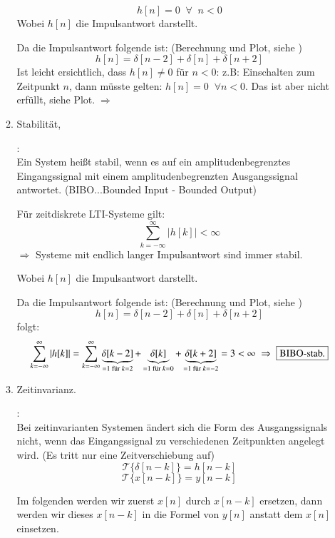 \begin{uebsp}
\begin{Answer}
\begin{enumerate}[a)]
\begin{enumerate}[1)]
\begin{definition}[Kausalität]
                        \[h[n]=0\;\;\forall\;\;n<0\]
                        Wobei $h[n]$ die Impulsantwort darstellt.
                    \end{definition}
                    Da die Impulsantwort folgende ist: (Berechnung und Plot, siehe )
                    \[h[n]=\delta[n-2]+\delta[n]+\delta[n+2]\]
                    Ist leicht ersichtlich, dass $h[n]\neq0$ für $n<0$:
                    z.B: Einschalten zum Zeitpunkt $n$, dann müsste gelten: $h[n]=0\;\;\forall n<0$.
                    Das ist aber nicht erfüllt, siehe Plot.$\;\Rightarrow\;$
                \item Stabilität,
                    \begin{definition}[Stabilität]:\\
                        Ein System heißt stabil, wenn es auf ein
                        amplitudenbegrenztes Eingangssignal mit einem
                        amplitudenbegrenzten Ausgangssignal antwortet.
                        (BIBO...Bounded Input - Bounded Output)

                        Für zeitdiskrete LTI-Systeme gilt:
                        \[\sum_{k=-\infty}^\infty\left|h[k]\right|<\infty\]
                        $\Rightarrow$ Systeme mit endlich langer Impulsantwort sind immer stabil.

                        Wobei $h[n]$ die Impulsantwort darstellt.
                    \end{definition}
                    Da die Impulsantwort folgende ist: (Berechnung und Plot, siehe )
                    \[h[n]=\delta[n-2]+\delta[n]+\delta[n+2]\]
                    folgt:
                    \[\sum_{k=-\infty}^\infty |h[k]|=\sum_{k=-\infty}^\infty\underbrace{\delta[k-2]}_{=1\text{ für }k=2}+\underbrace{\delta[k]}_{=1\text{ für }k=0}+\underbrace{\delta[k+2]}_{=1\text{ für }k=-2}=3<\infty\;\Rightarrow\;\fbox{BIBO-stab.}\]
                \item Zeitinvarianz.
                    \begin{definition}[Zeitinvarianz]:\\
                        Bei zeitinvarianten Systemen ändert sich die Form des
                        Ausgangssignals nicht, wenn das Eingangssignal zu
                        verschiedenen Zeitpunkten angelegt wird. (Es tritt nur
                        eine Zeitverschiebung auf)
                        \[\mathcal{T}\{\delta[n-k]\}=h[n-k]\]
                        \[\mathcal{T}\{x[n-k]\}=y[n-k]\]
                    \end{definition}
                Im folgenden werden wir zuerst $x[n]$ durch $x[n-k]$ ersetzen, 
                dann werden wir dieses $x[n-k]$ in die Formel von $y[n]$
                anstatt dem $x[n]$ einsetzen.


\end{enumerate}
\end{enumerate}
\end{Answer}
\end{uebsp}
